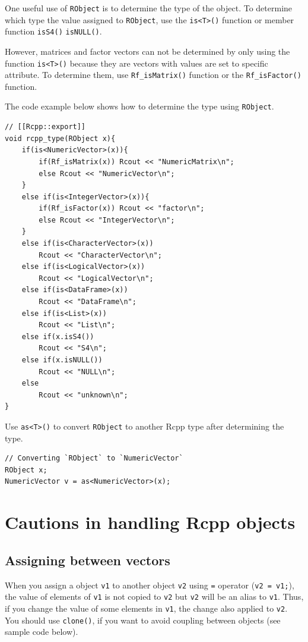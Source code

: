 \documentclass[]{book}
\theoremstyle{definition}
\theoremstyle{definition}
\theoremstyle{remark}
\begin{document}
One useful use of \texttt{RObject} is to determine the type of the
object. To determine which type the value assigned to \texttt{RObject},
use the \texttt{is\textless{}T\textgreater{}()} function or member
function \texttt{isS4()} \texttt{isNULL()}.

However, matrices and factor vectors can not be determined by only using
the function \texttt{is\textless{}T\textgreater{}()} because they are
vectors with values are set to specific attribute. To determine them,
use \texttt{Rf\_isMatrix()} function or the \texttt{Rf\_isFactor()}
function.

The code example below shows how to determine the type using
\texttt{RObject}.

\begin{verbatim}
// [[Rcpp::export]]
void rcpp_type(RObject x){
    if(is<NumericVector>(x)){
        if(Rf_isMatrix(x)) Rcout << "NumericMatrix\n";
        else Rcout << "NumericVector\n";       
    }
    else if(is<IntegerVector>(x)){
        if(Rf_isFactor(x)) Rcout << "factor\n";
        else Rcout << "IntegerVector\n";
    }
    else if(is<CharacterVector>(x))
        Rcout << "CharacterVector\n";
    else if(is<LogicalVector>(x))
        Rcout << "LogicalVector\n";
    else if(is<DataFrame>(x))
        Rcout << "DataFrame\n";
    else if(is<List>(x))
        Rcout << "List\n";
    else if(x.isS4())
        Rcout << "S4\n";
    else if(x.isNULL())
        Rcout << "NULL\n";
    else
        Rcout << "unknown\n";
}
\end{verbatim}

Use \texttt{as\textless{}T\textgreater{}()} to convert \texttt{RObject}
to another Rcpp type after determining the type.

\begin{verbatim}
// Converting `RObject` to `NumericVector`
RObject x;
NumericVector v = as<NumericVector>(x);
\end{verbatim}

\chapter{Cautions in handling Rcpp
objects}\label{cautions-in-handling-rcpp-objects}

\section{Assigning between vectors}\label{assigning-between-vectors}

When you assign a object \texttt{v1} to another object \texttt{v2} using
\texttt{=} operator (\texttt{v2\ =\ v1;}), the value of elements of
\texttt{v1} is not copied to \texttt{v2} but \texttt{v2} will be an
alias to \texttt{v1}. Thus, if you change the value of some elements in
\texttt{v1}, the change also applied to \texttt{v2}. You should use
\texttt{clone()}, if you want to avoid coupling between objects (see
sample code below).
\end{document}
